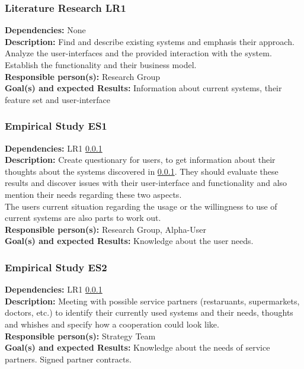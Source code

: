 \documentclass[a4paper,11pt]{article}
\begin{document}
\subsubsection{Literature Research LR1}
\label{sect:workplan:phase1:lr1}
\textbf{Dependencies:} None\\
\textbf{Description:} Find and describe existing systems and emphasis their approach.
Analyze the user-interfaces and the provided interaction with the system. Establish the functionality and their business model.\\
\textbf{Responsible person(s):} Research Group\\
\textbf{Goal(s) and expected Results:} Information about current systems, their feature set and user-interface\\

\subsubsection{Empirical Study ES1}
\label{sect:workplan:phase1:es1}
\textbf{Dependencies:} LR1 \ref{sect:workplan:phase1:lr1}\\
\textbf{Description:} Create questionary for users, to get information about their thoughts about the systems discovered in \ref{sect:workplan:phase1:lr1}. They should evaluate these results and discover issues with their user-interface and functionality and also mention their needs regarding these two aspects.\\
The users current situation regarding the usage or the willingness to use of current systems are also parts to work out. \\
\textbf{Responsible person(s):} Research Group, Alpha-User \\
\textbf{Goal(s) and expected Results:} Knowledge about the user needs.\\

\subsubsection{Empirical Study ES2}
\label{sect:workplan:phase1:es2}
\textbf{Dependencies:} LR1 \ref{sect:workplan:phase1:lr1}\\
\textbf{Description:} Meeting with possible service partners (restaruants, supermarkets, doctors, etc.) to identify their currently used systems and their needs, thoughts and whishes and specify how a cooperation could look like.\\
\textbf{Responsible person(s):} Strategy Team\\
\textbf{Goal(s) and expected Results:} Knowledge about the needs of service partners. Signed partner contracts. \\
\end{document}
